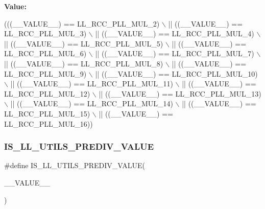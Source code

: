 {\bfseries Value\+:}
\begin{DoxyCode}
(((\_\_VALUE\_\_) == LL\_RCC\_PLL\_MUL\_2) \(\backslash\)
                                          || ((\_\_VALUE\_\_) == LL\_RCC\_PLL\_MUL\_3) \(\backslash\)
                                          || ((\_\_VALUE\_\_) == LL\_RCC\_PLL\_MUL\_4) \(\backslash\)
                                          || ((\_\_VALUE\_\_) == LL\_RCC\_PLL\_MUL\_5) \(\backslash\)
                                          || ((\_\_VALUE\_\_) == LL\_RCC\_PLL\_MUL\_6) \(\backslash\)
                                          || ((\_\_VALUE\_\_) == LL\_RCC\_PLL\_MUL\_7) \(\backslash\)
                                          || ((\_\_VALUE\_\_) == LL\_RCC\_PLL\_MUL\_8) \(\backslash\)
                                          || ((\_\_VALUE\_\_) == LL\_RCC\_PLL\_MUL\_9) \(\backslash\)
                                          || ((\_\_VALUE\_\_) == LL\_RCC\_PLL\_MUL\_10) \(\backslash\)
                                          || ((\_\_VALUE\_\_) == LL\_RCC\_PLL\_MUL\_11) \(\backslash\)
                                          || ((\_\_VALUE\_\_) == LL\_RCC\_PLL\_MUL\_12) \(\backslash\)
                                          || ((\_\_VALUE\_\_) == LL\_RCC\_PLL\_MUL\_13) \(\backslash\)
                                          || ((\_\_VALUE\_\_) == LL\_RCC\_PLL\_MUL\_14) \(\backslash\)
                                          || ((\_\_VALUE\_\_) == LL\_RCC\_PLL\_MUL\_15) \(\backslash\)
                                          || ((\_\_VALUE\_\_) == LL\_RCC\_PLL\_MUL\_16))
\end{DoxyCode}
\mbox{\label{group___u_t_i_l_s___l_l___private___macros_gacbce4695ecbf357f8d7196b39e26e8a5}} 
\subsubsection{\texorpdfstring{I\+S\+\_\+\+L\+L\+\_\+\+U\+T\+I\+L\+S\+\_\+\+P\+R\+E\+D\+I\+V\+\_\+\+V\+A\+L\+UE}{IS\_LL\_UTILS\_PREDIV\_VALUE}}
{\footnotesize\ttfamily \#define I\+S\+\_\+\+L\+L\+\_\+\+U\+T\+I\+L\+S\+\_\+\+P\+R\+E\+D\+I\+V\+\_\+\+V\+A\+L\+UE(\begin{DoxyParamCaption}\item[{}]{\+\_\+\+\_\+\+V\+A\+L\+U\+E\+\_\+\+\_\+ }\end{DoxyParamCaption})}

